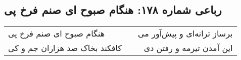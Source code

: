 \begin{center}
\section*{رباعی شماره ۱۷۸: هنگام صبوح ای صنم فرخ پی}
\label{sec:sh178}
\begin{longtable}{l p{0.5cm} r}
هنگام صبوح ای صنم فرخ پی
&&
برساز ترانه‌ای و پیش‌آور می
\\
کافکند بخاک صد هزاران جم و کی
&&
این آمدن تیرمه و رفتن دی
\\
\end{longtable}
\end{center}
